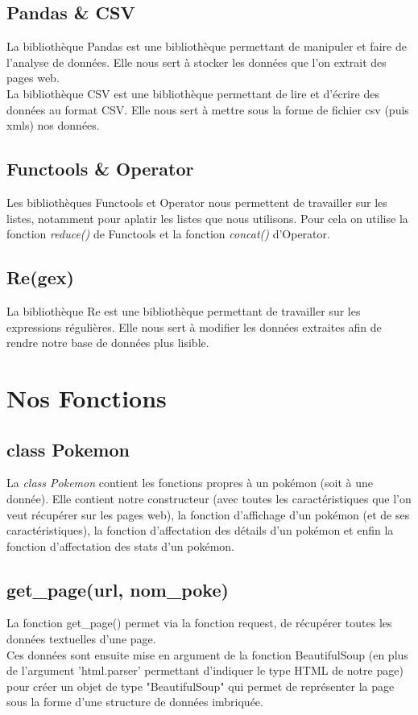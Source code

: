 \documentclass[a4paper, titlepage]{report}
\begin{document}
\subsection*{Pandas \& CSV}
\textnormal{La bibliothèque Pandas est une bibliothèque permettant de manipuler et faire de l'analyse de données. Elle nous sert à stocker les données que l'on extrait des pages web.\\
La bibliothèque CSV est une bibliothèque permettant de lire et d'écrire des données au format CSV. Elle nous sert à mettre sous la forme de fichier csv (puis xmls) nos données.}

\subsection*{Functools \& Operator}
\textnormal{Les bibliothèques Functools et Operator nous permettent de travailler sur les listes, notamment pour aplatir les listes que nous utilisons. Pour cela on utilise la fonction \textit{reduce()} de Functools et la fonction \textit{concat()} d'Operator.}

\subsection*{Re(gex)}
\textnormal{La bibliothèque Re est une bibliothèque permettant de travailler sur les expressions régulières. Elle nous sert à modifier les données extraites afin de rendre notre base de données plus lisible.}

\section*{Nos Fonctions}

\subsection*{class Pokemon}
\textnormal{La \textit{class Pokemon} contient les fonctions propres à un pokémon (soit à une donnée). Elle contient notre constructeur (avec toutes les caractéristiques que l'on veut récupérer sur les pages web), la fonction d'affichage d'un pokémon (et de ses caractéristiques), la fonction d'affectation des détails d'un pokémon et enfin la fonction d'affectation des stats d'un pokémon.}

\subsection*{get\_page(url, nom\_poke)}
\textnormal{La fonction get\_page() permet via la fonction request, de récupérer toutes les données textuelles d'une page.\\
Ces données sont ensuite mise en argument de la fonction BeautifulSoup (en plus de l'argument 'html.parser' permettant d'indiquer le type HTML de notre page) pour créer un objet de type "BeautifulSoup" qui permet de représenter la page sous la forme d'une structure de données imbriquée.}
\end{document}
